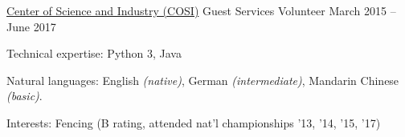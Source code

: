 \documentclass[10pt,a4paper]{article}
\begin{document}
\headedsection
  {\href{https://cosi.org/}{Center of Science and Industry (COSI)}}
  {\headedsubsection
    {Guest Services Volunteer}
    {March 2015 -- June 2017}
    {}
}

\spacedhrule{0.5em}{-0.4em}


\inlineheadsection  %
  {Technical expertise:}
  {Python 3, Java}
  
\inlineheadsection
  {Natural languages:}
  {English \emph{(native)}, German \emph{(intermediate)}, Mandarin Chinese \emph{(basic)}.}

\inlineheadsection
  {Interests:}
  {Fencing (B rating, attended nat'l championships '13, '14, '15, '17)}
\end{document}
